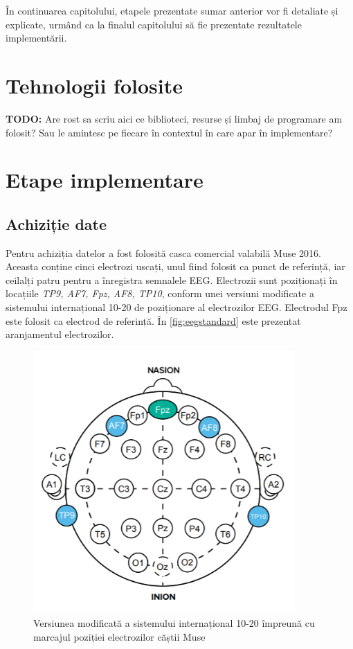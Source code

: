 În continuarea capitolului, etapele prezentate sumar anterior vor fi detaliate și explicate, urmând ca la finalul capitolului să fie prezentate rezultatele implementării.

\section{Tehnologii folosite}
\textbf{TODO:} Are rost sa scriu aici ce biblioteci, resurse și limbaj de programare am folosit? Sau le amintesc pe fiecare în contextul în care apar în implementare?

\section{Etape implementare}

\subsection{Achiziție date}
Pentru achiziția datelor a fost folosită casca comercial valabilă Muse 2016. Aceasta conține cinci electrozi uscați, unul fiind folosit ca punct de referință, iar ceilalți patru pentru a înregistra semnalele EEG. Electrozii sunt poziționați în locațiile \textit{TP9, AF7, Fpz, AF8, TP10}, conform unei versiuni modificate a sistemului internațional 10-20 de poziționare al electrozilor EEG. Electrodul Fpz este folosit ca electrod de referință. În \autoref{fig:eegstandard} este prezentat aranjamentul electrozilor.

\begin{figure}[ht]
\centering
\includegraphics[width=10cm, keepaspectratio]{fig/cap3/EEGstandard.png}
\caption{Versiunea modificată a sistemului internațional 10-20 împreună cu marcajul poziției electrozilor căștii Muse \cite{online:muse-eeg}}
\label{fig:eegstandard}
\end{figure}

